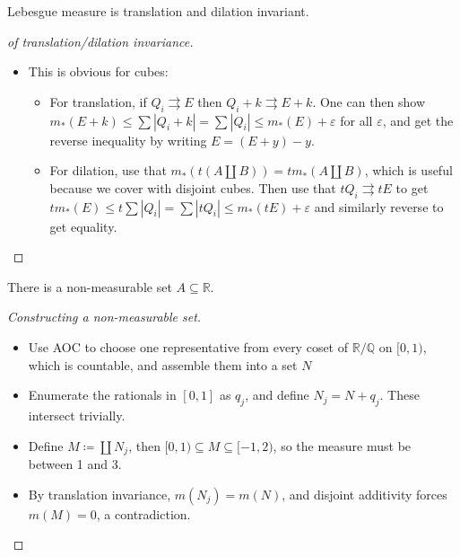 \begin{proposition}

Lebesgue measure is translation and dilation invariant.

\end{proposition}

\begin{proof}[of translation/dilation invariance]

\envlist

\begin{itemize}
\tightlist
\item
  This is obvious for cubes:

  \begin{itemize}
  \tightlist
  \item
    For translation, if \(Q_i \rightrightarrows E\) then
    \(Q_i + k \rightrightarrows E + k\). One can then show
    \(m_*(E + k) \leq \sum {\left\lvert {Q_i + k} \right\rvert} = \sum {\left\lvert {Q_i} \right\rvert}\leq m_*(E) + {\varepsilon}\)
    for all \({\varepsilon}\), and get the reverse inequality by writing
    \(E = (E+y)-y\).
  \item
    For dilation, use that
    \(m_*(t(A{\textstyle\coprod}B)) = tm_*(A{\textstyle\coprod}B)\),
    which is useful because we cover with disjoint cubes. Then use that
    \(tQ_i \rightrightarrows tE\) to get
    \(tm_*(E) \leq t\sum {\left\lvert {Q_i} \right\rvert} = \sum {\left\lvert {tQ_i} \right\rvert} \leq m_*(tE) + {\varepsilon}\)
    and similarly reverse to get equality.
  \end{itemize}
\end{itemize}

\end{proof}

\begin{theorem}

There is a non-measurable set \(A\subseteq {\mathbb{R}}\).

\end{theorem}

\begin{proof}[Constructing a non-measurable set]

\envlist

\begin{itemize}
\tightlist
\item
  Use AOC to choose one representative from every coset of
  \({\mathbb{R}}/{\mathbb{Q}}\) on \([0, 1)\), which is countable, and
  assemble them into a set \(N\)
\item
  Enumerate the rationals in \([0, 1]\) as \(q_{j}\), and define
  \(N_{j} = N + q_{j}\). These intersect trivially.
\item
  Define \(M \coloneqq{\textstyle\coprod}N_{j}\), then
  \([0, 1) \subseteq M \subseteq [-1, 2)\), so the measure must be
  between 1 and 3.
\item
  By translation invariance, \(m(N_{j}) = m(N)\), and disjoint
  additivity forces \(m(M) = 0\), a contradiction.
\end{itemize}

\end{proof}

